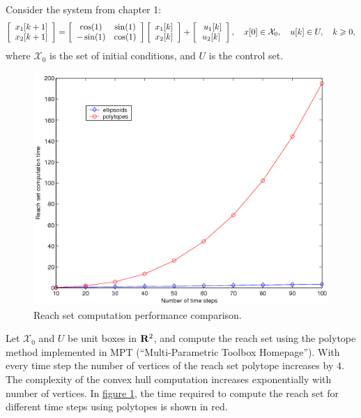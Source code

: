 \documentclass[letterpaper,10pt,english]{sphinxmanual}
\begin{document}
Consider the system from chapter 1:
\begin{gather}
\begin{split}\left[\begin{array}{c}
x_1[k+1]\\
x_2[k+1]\end{array}\right] = \left[\begin{array}{cc}
\cos(1) & \sin(1)\\
-\sin(1) & \cos(1)\end{array}\right]\left[\begin{array}{c}
x_1[k]\\
x_2[k]\end{array}\right] + \left[\begin{array}{c}\
u_1[k]\\
u_2[k]\end{array}\right], ~~~ x[0]\in{\mathcal X}_0, ~~~ u[k]\in U, ~~~ k\geqslant0,\end{split}\notag
\end{gather}
where ${\mathcal X}_0$ is the set of initial conditions, and
$U$ is the control set.
\begin{figure}[htbp]
\centering
\capstart

\includegraphics{ellpoly.png}
\caption{Reach set computation performance comparison.}\label{chap_examples:ellpolyfig}\end{figure}

Let ${\mathcal X}_0$ and $U$ be unit boxes in
${\bf R}^2$, and compute the reach set using the polytope method
implemented in MPT (“Multi-Parametric Toolbox Homepage”). With every
time step the number of vertices of the reach set polytope increases by
$4$. The complexity of the convex hull computation increases
exponentially with number of vertices. In \hyperref[chap_examples:ellpolyfig]{figure  \ref*{chap_examples:ellpolyfig}}, the time
required to compute the reach set for different time steps using
polytopes is shown in red.
\end{document}
